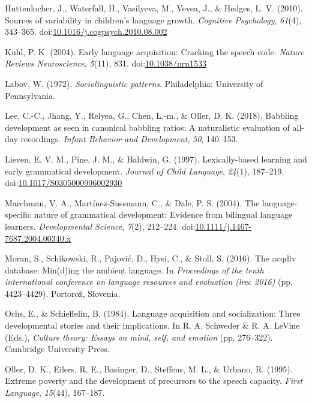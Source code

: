 \documentclass[,man,floatsintext]{apa6}
\begin{document}
\hypertarget{ref-huttenlocher2010sources}{}
Huttenlocher, J., Waterfall, H., Vasilyeva, M., Vevea, J., \& Hedges, L.
V. (2010). Sources of variability in children's language growth.
\emph{Cognitive Psychology}, \emph{61}(4), 343--365.
doi:\href{https://doi.org/10.1016/j.cogpsych.2010.08.002}{10.1016/j.cogpsych.2010.08.002}

\hypertarget{ref-kuhl2004early}{}
Kuhl, P. K. (2004). Early language acquisition: Cracking the speech
code. \emph{Nature Reviews Neuroscience}, \emph{5}(11), 831.
doi:\href{https://doi.org/10.1038/nrn1533}{10.1038/nrn1533}

\hypertarget{ref-labov1972sociolinguistic}{}
Labov, W. (1972). \emph{Sociolinguistic patterns}. Philadelphia:
University of Pennsylvania.

\hypertarget{ref-lee2018babbling}{}
Lee, C.-C., Jhang, Y., Relyea, G., Chen, L.-m., \& Oller, D. K. (2018).
Babbling development as seen in canonical babbling ratios: A
naturalistic evaluation of all-day recordings. \emph{Infant Behavior and
Development}, \emph{50}, 140--153.

\hypertarget{ref-lieven1997lexically}{}
Lieven, E. V. M., Pine, J. M., \& Baldwin, G. (1997). Lexically-based
learning and early grammatical development. \emph{Journal of Child
Language}, \emph{24}(1), 187--219.
doi:\href{https://doi.org/10.1017/S0305000996002930}{10.1017/S0305000996002930}

\hypertarget{ref-marchman2004language}{}
Marchman, V. A., Martínez-Sussmann, C., \& Dale, P. S. (2004). The
language-specific nature of grammatical development: Evidence from
bilingual language learners. \emph{Developmental Science}, \emph{7}(2),
212--224.
doi:\href{https://doi.org/10.1111/j.1467-7687.2004.00340.x}{10.1111/j.1467-7687.2004.00340.x}

\hypertarget{ref-moran2016acqdiv}{}
Moran, S., Schikowski, R., Pajović, D., Hysi, C., \& Stoll, S. (2016).
The acqdiv database: Min(d)ing the ambient language. In
\emph{Proceedings of the tenth international conference on language
resources and evaluation (lrec 2016)} (pp. 4423--4429). Portorož,
Slovenia.

\hypertarget{ref-ochs1984language}{}
Ochs, E., \& Schieffelin, B. (1984). Language acquisition and
socialization: Three developmental stories and their implications. In R.
A. Schweder \& R. A. LeVine (Eds.), \emph{Culture theory: Essays on
mind, self, and emotion} (pp. 276--322). Cambridge University Press.

\hypertarget{ref-oller1995extreme}{}
Oller, D. K., Eilers, R. E., Basinger, D., Steffens, M. L., \& Urbano,
R. (1995). Extreme poverty and the development of precursors to the
speech capacity. \emph{First Language}, \emph{15}(44), 167--187.
\end{document}
